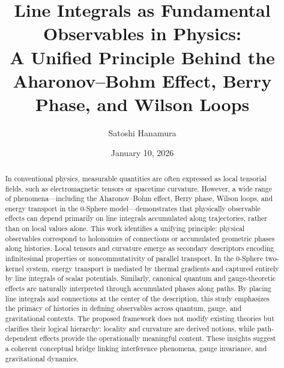 \documentclass[%
 reprint,
 amsmath,amssymb,
 aps,
 prb,
]{revtex4-2}
\numberwithin{equation}{section}
\begin{document}
\title{Line Integrals as Fundamental Observables in Physics:\\ A Unified Principle Behind the Aharonov–Bohm Effect, Berry Phase, and Wilson Loops}

\author{Satoshi Hanamura}
\date{January 10, 2026}

\begin{abstract}
In conventional physics, measurable quantities are often expressed as local tensorial fields, such as electromagnetic tensors or spacetime curvature. However, a wide range of phenomena—including the Aharonov–Bohm effect, Berry phase, Wilson loops, and energy transport in the 0-Sphere model—demonstrates that physically observable effects can depend primarily on line integrals accumulated along trajectories, rather than on local values alone.
This work identifies a unifying principle: physical observables correspond to holonomies of connections or accumulated geometric phases along histories. Local tensors and curvature emerge as secondary descriptors encoding infinitesimal properties or noncommutativity of parallel transport. In the 0-Sphere two-kernel system, energy transport is mediated by thermal gradients and captured entirely by line integrals of scalar potentials. Similarly, canonical quantum and gauge-theoretic effects are naturally interpreted through accumulated phases along paths.
By placing line integrals and connections at the center of the description, this study emphasizes the primacy of histories in defining observables across quantum, gauge, and gravitational contexts. The proposed framework does not modify existing theories but clarifies their logical hierarchy: locality and curvature are derived notions, while path-dependent effects provide the operationally meaningful content. These insights suggest a coherent conceptual bridge linking interference phenomena, gauge invariance, and gravitational dynamics.
\end{abstract}


\end{document}
